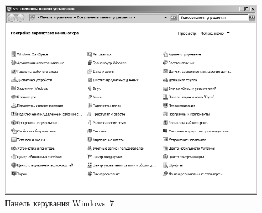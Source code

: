 \documentclass[
	a4paper,
	oneside,
	DIV = 12,
	BCOR = 10mm,
	12pt,
	headings = normal,
]{scrartcl}
\begin{document}
			\begin{figure}[!htbp]
				\centering
				\includegraphics[height = 12\baselineskip]{./assets/y03s01-syssoft-lab-01-scr-01-controlpanel-bw.png}
				\caption{Панель керування Windows~7}
				\label{fig:01-win7-control-panel}
			\end{figure}
			
\end{document}
